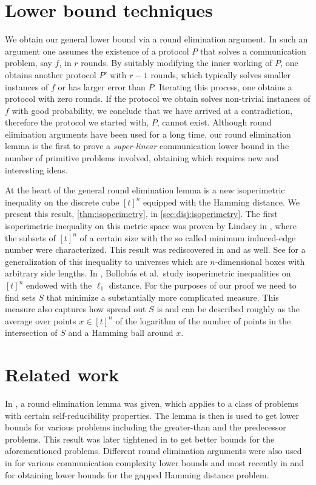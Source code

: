 \section{Lower bound techniques}
\label{sec:disj:techniques}

We obtain our general lower bound via a round elimination
argument. In such an argument one assumes the existence of a
protocol $P$ that solves a communication problem, say $f$, in
$r$ rounds. By suitably modifying the inner working of $P$, one
obtains another protocol $P'$ with $r-1$ rounds, which typically
solves smaller instances of $f$ or has larger error than $P$.
Iterating this process, one obtains a protocol with zero rounds.
If the protocol we obtain solves non-trivial instances of $f$
with good probability, we conclude that we have arrived at a
contradiction, therefore the protocol we started with, $P$,
cannot exist. Although round elimination arguments have been
used for a long time, our round elimination lemma is the first
to prove a {\em super-linear} communication lower bound in the
number of primitive problems involved, obtaining which requires
new and interesting ideas.

At the heart of the general round elimination lemma is a new
isoperimetric inequality on the discrete cube $[t]^n$ equipped
with the Hamming distance. We present this result,
\autoref{thm:isoperimetry}, in \autoref{sec:disj:isoperimetry}. 
The first isoperimetric inequality on
this metric space was proven by Lindsey in \cite{Lindsey1964},
where the subsets of $[t]^n$ of a certain size with the so
called minimum induced-edge number were characterized. This
result was rediscovered in \cite{KleitmanKR1971} and
\cite{Clements1971} as well. See \cite{AzizogluO2003} for a
generalization of this inequality to universes which are
$n$-dimensional boxes with arbitrary side lengths. In
\cite{BollobasL1991}, Bollobás et al.\ study isoperimetric
inequalities on $[t]^n$ endowed with the $\ell_1$ distance. For
the purposes of our proof we need to find sets $S$ that minimize
a substantially more complicated measure. This measure also
captures how spread out $S$ is and can be described roughly as
the average over points $x\in[t]^n$ of the logarithm of the
number of points in the intersection of $S$ and a Hamming ball
around $x$.

\section{Related work}
\label{sec:ham:related}
In \cite{MiltersenNSW1998}, a round
elimination lemma was given, which applies to a class of
problems with certain self-reducibility properties. The lemma is
then is used to get lower bounds for various problems including
the greater-than and the predecessor problems. This result was
later tightened in \cite{SenV2003} to get better bounds for the
aforementioned problems. Different round elimination arguments
were also used in \cite{KarchmerW1990, HalstenbergR1988,
NisanW1993,Miltersen1994, DurisGS1987,BeameF2001} for various
communication complexity lower bounds and most recently in
\cite{BrodyC2009} and \cite{BrodyCRVW2010} for obtaining lower
bounds for the gapped Hamming distance problem.

